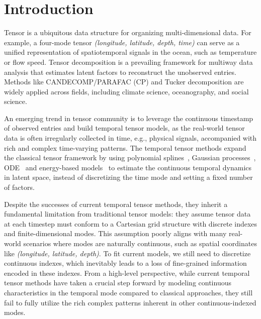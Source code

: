 \section{Introduction}

Tensor is a ubiquitous data structure for organizing multi-dimensional data. For example, a four-mode tensor \textit{(longitude, latitude, depth, time)} can serve as a unified representation of spatiotemporal signals in the ocean, such as temperature or flow speed. Tensor decomposition is a prevailing framework for multiway data analysis that estimates latent factors to reconstruct the unobserved entries. Methods like CANDECOMP/PARAFAC (CP)\citep{HarshmanCP} and Tucker decomposition\citep{sidiropoulos2017tensor} are widely applied across fields, including climate science, oceanography, and social science.

An emerging trend in tensor community is to leverage the continuous timestamp of observed entries and build temporal tensor models, as the real-world tensor data is often irregularly collected in time, e.g., physical signals, accompanied with rich and complex time-varying patterns. The temporal tensor methods expand the classical tensor framework by using polynomial splines~\citep{zhang2021dynamic}, Gaussian processes~\citep{bctt,SFTL}, ODE~\citep{thisode} and energy-based models~\citep{tao2023undirected} to estimate the continuous temporal dynamics in latent space, instead of discretizing the time mode and setting a fixed number of factors.

Despite the successes of current temporal tensor methods, they inherit a fundamental limitation from traditional tensor models: they assume tensor data at each timestep must conform to a Cartesian grid structure with discrete indexes and finite-dimensional modes. This assumption poorly aligns with many real-world scenarios where modes are naturally continuous, such as spatial coordinates like \textit{(longitude, latitude, depth)}. To fit current models, we still need to discretize continuous indexes, which inevitably leads to a loss of fine-grained information encoded in these indexes. From a high-level perspective, while current temporal tensor methods have taken a crucial step forward by modeling continuous characteristics in the temporal mode compared to classical approaches, they still fail to fully utilize the rich complex patterns inherent in other continuous-indexed modes. 


